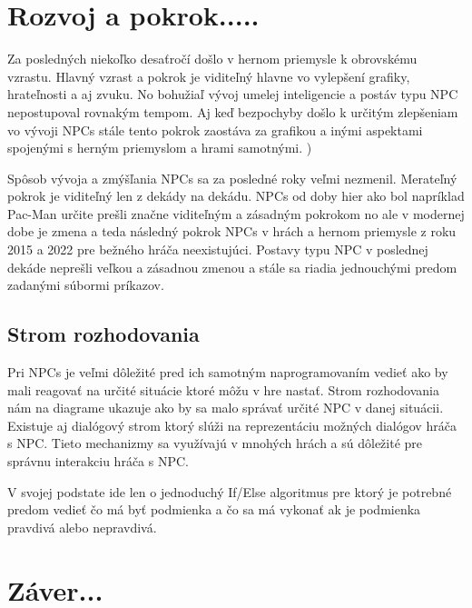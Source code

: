 \documentclass[10pt,twoside,slovak,a4paper]{article}
\begin{document}
\section{Rozvoj a pokrok.....}  \label{Rozvoj}

Za posledných niekoľko desaťročí došlo v hernom priemysle k obrovskému vzrastu. Hlavný vzrast a pokrok je viditeľný hlavne vo vylepšení grafiky, hrateľnosti a aj zvuku. No bohužiaľ vývoj umelej inteligencie a postáv typu NPC nepostupoval rovnakým tempom. Aj keď bezpochyby došlo k určitým zlepšeniam vo vývoji NPCs stále tento pokrok zaostáva za grafikou a inými aspektami spojenými s herným priemyslom a hrami samotnými. \cite{phdthesis})

Spôsob vývoja a zmýšľania NPCs sa za posledné roky veľmi nezmenil. Merateľný pokrok je viditeľný len z dekády na dekádu. NPCs od doby hier ako bol napríklad Pac-Man určite prešli značne viditeľným a zásadným pokrokom no ale v modernej dobe je zmena a teda následný pokrok NPCs v hrách a hernom priemysle z roku 2015 a 2022 pre bežného hráča neexistujúci. Postavy typu NPC v poslednej dekáde neprešli veľkou a zásadnou zmenou a stále sa riadia jednouchými predom zadanými súbormi príkazov. \cite{9730383}  

\subsection{Strom rozhodovania}
Pri NPCs je veľmi dôležité pred ich samotným naprogramovaním vedieť ako by mali reagovať na určité situácie ktoré môžu v hre nastať. Strom rozhodovania nám na diagrame ukazuje ako by sa malo správať určité NPC v danej situácii. \cite{9291553} Existuje aj dialógový strom ktorý slúži na reprezentáciu možných dialógov hráča s NPC. Tieto mechanizmy sa využívajú v mnohých hrách a sú dôležité pre správnu interakciu hráča s NPC.

V svojej podstate ide len o jednoduchý If/Else algoritmus pre ktorý je potrebné predom vedieť čo má byť podmienka a čo sa má vykonať ak je podmienka pravdivá alebo nepravdivá. 





\section{Záver...}





\end{document}
